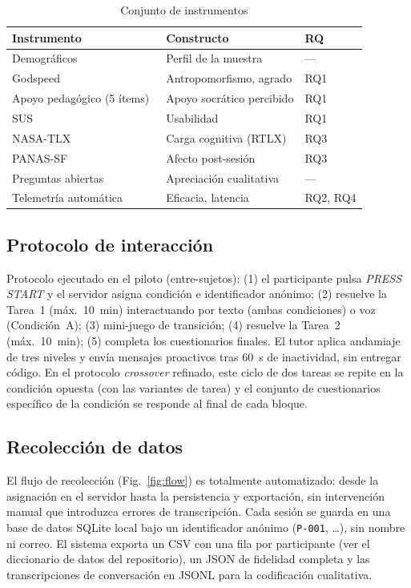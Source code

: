 \documentclass[conference]{IEEEtran}
\begin{document}
\begin{table}[t]
  \caption{Conjunto de instrumentos}
  \label{tab:instruments}
  \centering
  \footnotesize
  \begin{tabular}{@{}lll@{}}
    \toprule
    \textbf{Instrumento} & \textbf{Constructo} & \textbf{RQ} \\
    \midrule
    Demogr\'aficos & Perfil de la muestra & --- \\
    Godspeed~\cite{bartneck2009godspeed} & Antropomorfismo, agrado & RQ1 \\
    Apoyo pedag\'ogico (5 \'items)~\cite{essel2024aimediated} & Apoyo socr\'atico percibido & RQ1 \\
    SUS~\cite{brooke1996sus} & Usabilidad & RQ1 \\
    NASA-TLX~\cite{hart1988nasatlx} & Carga cognitiva (RTLX) & RQ3 \\
    PANAS-SF~\cite{thompson2007ipanas} & Afecto post-sesi\'on & RQ3 \\
    Preguntas abiertas & Apreciaci\'on cualitativa & --- \\
    Telemetr\'ia autom\'atica & Eficacia, latencia & RQ2, RQ4 \\
    \bottomrule
  \end{tabular}
\end{table}

\subsection{Protocolo de interacci\'on}
Protocolo ejecutado en el piloto (entre-sujetos): (1) el participante pulsa \emph{PRESS START} y el
servidor asigna condici\'on e identificador an\'onimo; (2) resuelve la Tarea~1 (m\'ax.\ 10~min)
interactuando por texto (ambas condiciones) o voz (Condici\'on~A); (3) mini-juego de transici\'on;
(4) resuelve la Tarea~2 (m\'ax.\ 10~min); (5) completa los cuestionarios finales. El tutor aplica
andamiaje de tres niveles y env\'ia mensajes proactivos tras 60~s de inactividad, sin entregar
c\'odigo. En el protocolo \emph{crossover} refinado, este ciclo de dos tareas se repite en la
condici\'on opuesta (con las variantes de tarea) y el conjunto de cuestionarios espec\'ifico de la
condici\'on se
responde al final de cada bloque.

\subsection{Recolecci\'on de datos}
El flujo de recolecci\'on (Fig.~\ref{fig:flow}) es totalmente automatizado: desde la asignaci\'on
en el servidor hasta la persistencia y exportaci\'on, sin intervenci\'on manual que introduzca
errores de transcripci\'on. Cada sesi\'on se guarda en una base de datos SQLite local bajo un
identificador an\'onimo (\texttt{P-001}, \dots), sin nombre ni correo. El sistema exporta un CSV con
una fila por participante (ver el diccionario de datos del repositorio), un JSON de fidelidad
completa y las transcripciones de conversaci\'on en JSONL para la codificaci\'on cualitativa.
\end{document}
